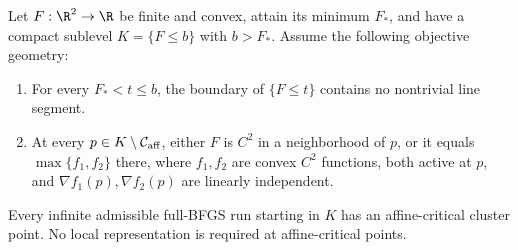 \begin{theorem}\label{art:planar-cluster}
Let $F:\R^2\to\R$ be finite and convex, attain its minimum $F_*$, and have
a compact sublevel $K=\{F\le b\}$ with $b>F_*$. Assume the following
objective geometry:

\begin{enumerate}
\item For every $F_*<t\le b$, the boundary of $\{F\le t\}$ contains no
nontrivial line segment.
\item At every $p\in K\setminus\mathcal C_{\rm aff}$, either $F$ is $C^2$
in a neighborhood of $p$, or it equals $\max\{f_1,f_2\}$ there, where
$f_1,f_2$ are convex $C^2$ functions, both active at $p$, and
$\nabla f_1(p),\nabla f_2(p)$ are linearly independent.
\end{enumerate}
Every infinite admissible full-BFGS run starting in $K$ has an affine-critical
cluster point. No local representation is required at affine-critical points.
\end{theorem}
